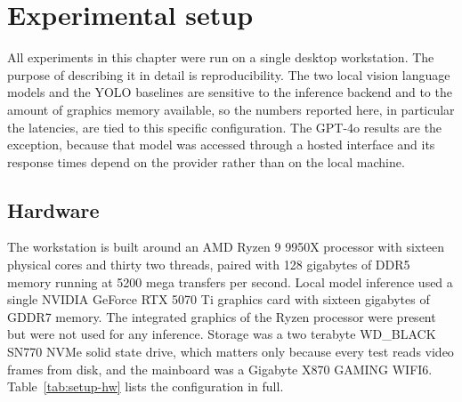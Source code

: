
\section{Experimental setup}
\label{sec:setup}

All experiments in this chapter were run on a single desktop workstation.
The purpose of describing it in detail is reproducibility. The two local
vision language models and the YOLO baselines are sensitive to the
inference backend and to the amount of graphics memory available, so the
numbers reported here, in particular the latencies, are tied to this
specific configuration. The GPT-4o results are the exception, because that
model was accessed through a hosted interface and its response times
depend on the provider rather than on the local machine.

\subsection{Hardware}

The workstation is built around an AMD Ryzen 9 9950X processor with
sixteen physical cores and thirty two threads, paired with 128 gigabytes
of DDR5 memory running at 5200 mega transfers per second. Local model
inference used a single NVIDIA GeForce RTX 5070 Ti graphics card with
sixteen gigabytes of GDDR7 memory. The integrated graphics of the Ryzen
processor were present but were not used for any inference. Storage was a
two terabyte WD\_BLACK SN770 NVMe solid state drive, which matters only
because every test reads video frames from disk, and the mainboard was a
Gigabyte X870 GAMING WIFI6. Table~\ref{tab:setup-hw} lists the
configuration in full.

